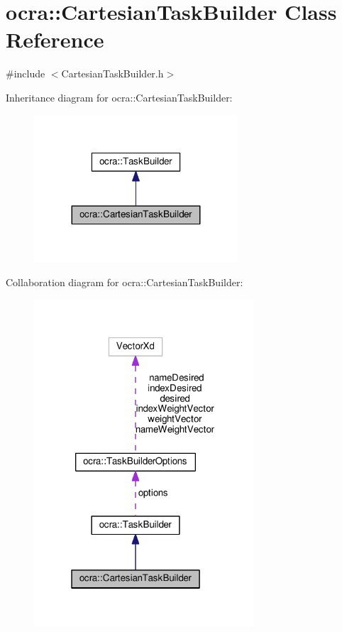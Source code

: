\hypertarget{classocra_1_1CartesianTaskBuilder}{}\section{ocra\+:\+:Cartesian\+Task\+Builder Class Reference}
\label{classocra_1_1CartesianTaskBuilder}


{\ttfamily \#include $<$Cartesian\+Task\+Builder.\+h$>$}



Inheritance diagram for ocra\+:\+:Cartesian\+Task\+Builder\+:
\nopagebreak
\begin{figure}[H]
\begin{center}
\leavevmode
\includegraphics[width=215pt]{d0/d4d/classocra_1_1CartesianTaskBuilder__inherit__graph}
\end{center}
\end{figure}


Collaboration diagram for ocra\+:\+:Cartesian\+Task\+Builder\+:
\nopagebreak
\begin{figure}[H]
\begin{center}
\leavevmode
\includegraphics[width=232pt]{d9/d96/classocra_1_1CartesianTaskBuilder__coll__graph}
\end{center}
\end{figure}
